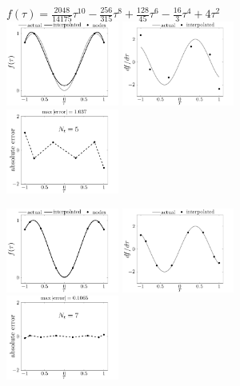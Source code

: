 \begin{figure}
\centering
{\large$f(\tau) = \frac{2048}{14175}\tau^{10} - \frac{256}{315}\tau^8 + \frac{128}{45} \tau^6 - \frac{16}{3}\tau^4 + 4\tau^2$}\\
\includegraphics[width=0.33\textwidth, trim=0in 0in 0.5in 0in,clip=true]{../app3/figures/diff-1}%
\includegraphics[width=0.33\textwidth, trim=0in 0in 0.5in 0in,clip=true]{../app3/figures/diff-2}%
\includegraphics[width=0.33\textwidth, trim=0in 0in 0.5in 0in,clip=true]{../app3/figures/diff-3}%

\includegraphics[width=0.33\textwidth, trim=0in 0in 0.5in 0in,clip=true]{../app3/figures/diff-4}%
\includegraphics[width=0.33\textwidth, trim=0in 0in 0.5in 0in,clip=true]{../app3/figures/diff-5}%
\includegraphics[width=0.33\textwidth, trim=0in 0in 0.5in 0in,clip=true]{../app3/figures/diff-6}%


\end{figure}

